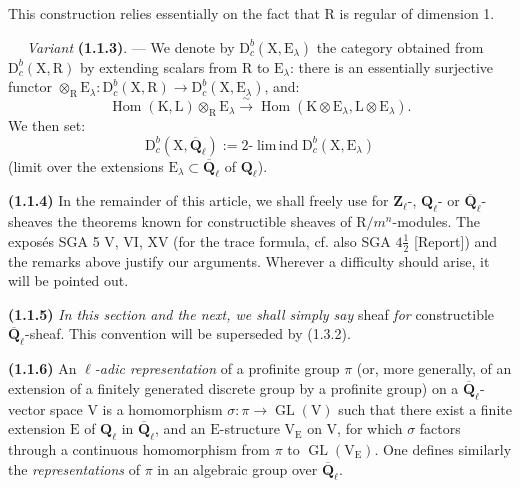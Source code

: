 \documentclass[11pt,leqno]{article}
\newcommand{\Page}[1]{\ifvmode\noindent\else\unskip\ \fi{\footnotesize\textcolor{gray}{[p.\,#1]}}\ \ignorespaces}
\begin{document}
This construction relies essentially on the fact that \(\mathrm{R}\) is regular of dimension 1.

\Page{150}
\textit{Variant} \textbf{(1.1.3)}. — We denote by \(\mathrm{D}_c^b(\mathrm{X},\mathrm{E}_\lambda)\) the category obtained from \(\mathrm{D}_c^b(\mathrm{X},\mathrm{R})\) by extending scalars from \(\mathrm{R}\) to \(\mathrm{E}_\lambda\): there is an essentially surjective functor \(\otimes_{\mathrm{R}}\mathrm{E}_\lambda:\mathrm{D}_c^b(\mathrm{X},\mathrm{R})\to\mathrm{D}_c^b(\mathrm{X},\mathrm{E}_\lambda)\), and:
\[
\operatorname{Hom}(\mathrm{K},\mathrm{L})\otimes_{\mathrm{R}}\mathrm{E}_\lambda
\overset{\sim}{\to}
\operatorname{Hom}(\mathrm{K}\otimes\mathrm{E}_\lambda,\mathrm{L}\otimes\mathrm{E}_\lambda).
\]
We then set:
\[
\mathrm{D}_c^b(\mathrm{X},\overline{\mathbf{Q}}_\ell)
:=2\text{-}\operatorname{lim\,ind}\mathrm{D}_c^b(\mathrm{X},\mathrm{E}_\lambda)
\]
(limit over the extensions \(\mathrm{E}_\lambda\subset\overline{\mathbf{Q}}_\ell\) of \(\mathbf{Q}_\ell\)).

\textbf{(1.1.4)} In the remainder of this article, we shall freely use for \(\mathbf{Z}_\ell\)-, \(\mathbf{Q}_\ell\)- or \(\overline{\mathbf{Q}}_\ell\)-sheaves the theorems known for constructible sheaves of \(\mathrm{R}/m^n\)-modules. The exposés SGA 5 V, VI, XV (for the trace formula, cf. also SGA \(4\frac{1}{2}\) [Report]) and the remarks above justify our arguments. Wherever a difficulty should arise, it will be pointed out.

\textbf{(1.1.5)} \textit{In this section and the next, we shall simply say} sheaf \textit{for} constructible \(\overline{\mathbf{Q}}_\ell\)-sheaf. This convention will be superseded by (1.3.2).

\textbf{(1.1.6)} An \textit{\(\ell\)-adic representation} of a profinite group \(\pi\) (or, more generally, of an extension of a finitely generated discrete group by a profinite group) on a \(\overline{\mathbf{Q}}_\ell\)-vector space \(\mathrm{V}\) is a homomorphism \(\sigma:\pi\to\operatorname{GL}(\mathrm{V})\) such that there exist a finite extension \(\mathrm{E}\) of \(\mathbf{Q}_\ell\) in \(\overline{\mathbf{Q}}_\ell\), and an \(\mathrm{E}\)-structure \(\mathrm{V}_{\mathrm{E}}\) on \(\mathrm{V}\), for which \(\sigma\) factors through a continuous homomorphism from \(\pi\) to \(\operatorname{GL}(\mathrm{V}_{\mathrm{E}})\). One defines similarly the \textit{representations} of \(\pi\) in an algebraic group over \(\overline{\mathbf{Q}}_\ell\).
\end{document}
